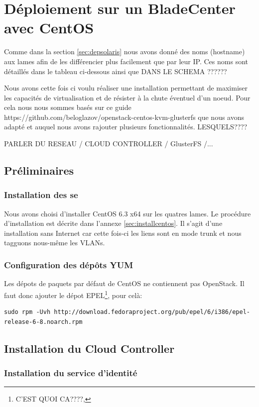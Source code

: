 \documentclass[a4paper,oneside]{report}
\begin{document}
\section{Déploiement sur un BladeCenter avec CentOS}
Comme dans la section \ref{sec:depsolaris} nous avons donné des noms (hostname) aux lames afin de les différencier plus facilement que par leur IP.
Ces noms sont détaillés dans le tableau ci-dessous ainsi que DANS LE SCHEMA ??????

Nous avons cette fois ci voulu réaliser une installation permettant de maximiser les capacités de virtualisation et de résister à la chute éventuel d'un noeud.
Pour cela nous nous sommes basés sur ce guide https://github.com/beloglazov/openstack-centos-kvm-glusterfs que nous avons adapté et auquel nous avons rajouter plusieurs fonctionnalités. LESQUELS????

PARLER DU RESEAU / CLOUD CONTROLLER / GlusterFS /...

\subsection{Préliminaires}
\subsubsection{Installation des \gls{se}}
Nous avons choisi d'installer CentOS 6.3 x64 sur les quatres lames. Le procédure d'installation est décrite dans l'annexe \ref{sec:installcentos}.\newline
Il s'agit d'une installation sans Internet car cette fois-ci les liens sont en mode trunk et nous tagguons nous-même les VLANs.

\subsubsection{Configuration des dépôts YUM}
Les dépots de paquets par défaut de CentOS ne contiennent pas OpenStack. Il faut donc ajouter le dépot EPEL\footnote{C'EST QUOI CA????,}, pour celà:
\begin{verbatim}
sudo rpm -Uvh http://download.fedoraproject.org/pub/epel/6/i386/epel-release-6-8.noarch.rpm
\end{verbatim}

\subsection{Installation du Cloud Controller}
\subsubsection{Installation du service d'identité}
\end{document}
